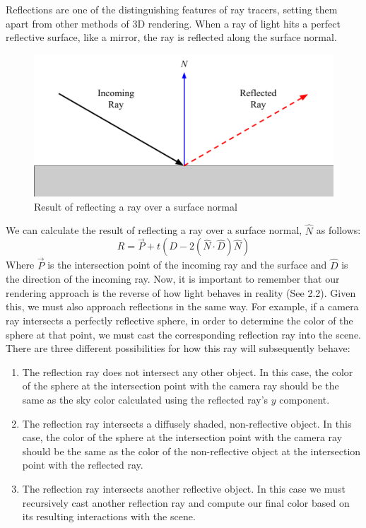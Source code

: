 Reflections are one of the distinguishing features of ray tracers, setting them apart from other methods of 3D rendering. When a ray of light hits a perfect reflective surface, like a mirror, the ray is reflected along the surface normal.
\begin{figure}[H]
    \centering
    \includegraphics[scale=0.35]{figures/Reflections.png}
    \caption{Result of reflecting a ray over a surface normal}
    \label{fig:reflection_ray}
\end{figure}
\noindent
We can calculate the result of reflecting a ray over a surface normal, $\hat N$ as follows:
$$R = \Vec{P} + t(\hat{D} - 2(\hat{N} \cdot \hat{D})\hat{N})$$
Where $\Vec{P}$ is the intersection point of the incoming ray and the surface and $\hat{D}$ is the direction of the incoming ray. Now, it is important to remember that our rendering approach is the reverse of how light behaves in reality (See 2.2). Given this, we must also approach reflections in the same way. For example, if a camera ray intersects a perfectly reflective sphere, in order to determine the color of the sphere at that point, we must cast the corresponding reflection ray into the scene. There are three different possibilities for how this ray will subsequently behave:
\begin{enumerate}
    \item The reflection ray does not intersect any other object. In this case, the color of the sphere at the intersection point with the camera ray should be the same as the sky color calculated using the reflected ray's $y$ component.
    \item The reflection ray intersects a diffusely shaded, non-reflective object. In this case, the color of the sphere at the intersection point with the camera ray should be the same as the color of the non-reflective object at the intersection point with the reflected ray.
    \item The reflection ray intersects another reflective object. In this case we must recursively cast another reflection ray and compute our final color based on its resulting interactions with the scene.
\end{enumerate}
